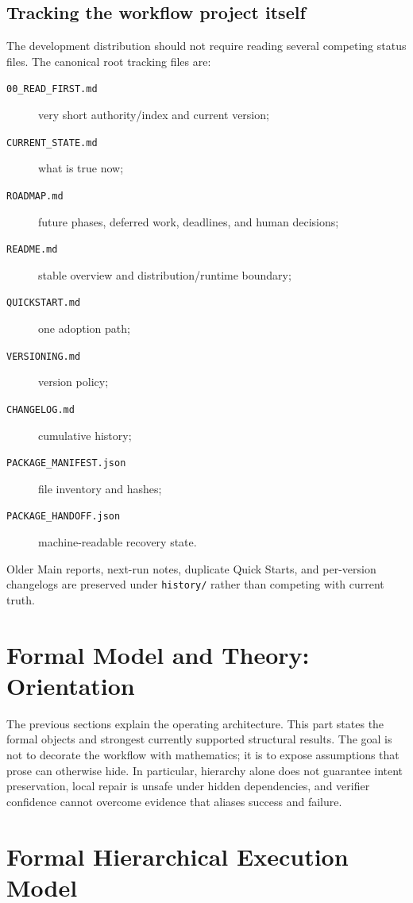 \documentclass[11pt,a4paper]{article}
\begin{document}
\subsection{Tracking the workflow project itself}
The development distribution should not require reading several competing status files. The canonical root tracking files are:
\begin{description}
\item[\texttt{00\_READ\_FIRST.md}] very short authority/index and current version;
\item[\texttt{CURRENT\_STATE.md}] what is true now;
\item[\texttt{ROADMAP.md}] future phases, deferred work, deadlines, and human decisions;
\item[\texttt{README.md}] stable overview and distribution/runtime boundary;
\item[\texttt{QUICKSTART.md}] one adoption path;
\item[\texttt{VERSIONING.md}] version policy;
\item[\texttt{CHANGELOG.md}] cumulative history;
\item[\texttt{PACKAGE\_MANIFEST.json}] file inventory and hashes;
\item[\texttt{PACKAGE\_HANDOFF.json}] machine-readable recovery state.
\end{description}
Older Main reports, next-run notes, duplicate Quick Starts, and per-version changelogs are preserved under \texttt{history/} rather than competing with current truth.


\section{Formal Model and Theory: Orientation}\label{sec:formal-orientation}
The previous sections explain the operating architecture. This part states the formal objects and strongest currently supported structural results. The goal is not to decorate the workflow with mathematics; it is to expose assumptions that prose can otherwise hide. In particular, hierarchy alone does not guarantee intent preservation, local repair is unsafe under hidden dependencies, and verifier confidence cannot overcome evidence that aliases success and failure.

\section{Formal Hierarchical Execution Model}
\end{document}
